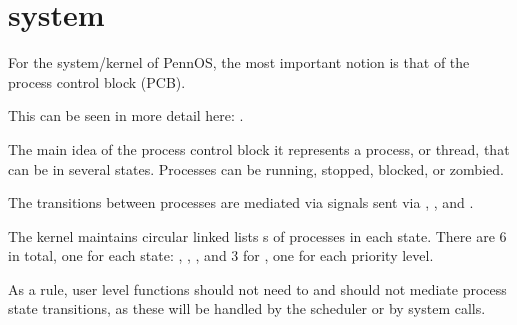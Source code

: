 \chapter{system}
\hypertarget{md_doc_2system}{}\label{md_doc_2system}
For the system/kernel of Penn\+OS, the most important notion is that of the process control block (PCB).

This can be seen in more detail here\+: .

The main idea of the process control block it represents a process, or thread, that can be in several states. Processes can be running, stopped, blocked, or zombied.

The transitions between processes are mediated via signals sent via , , and .

The kernel maintains circular linked lists \textquotesingle{}s of processes in each state. There are 6 in total, one for each state\+: , , , and 3 for , one for each priority level.

As a rule, user level functions should not need to and should not mediate process state transitions, as these will be handled by the scheduler or by system calls. 